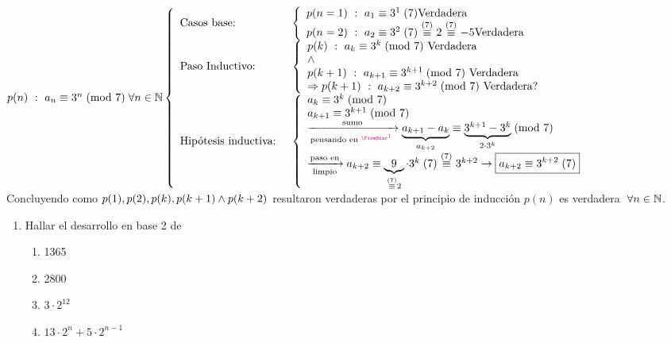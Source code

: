 $ p(n)\ :\ \congruencia{a_n}{3^n}{\text{mod } 7} \paratodo n \en \naturales\\
	\llave{ll}{
		\text{Casos base: } &
		\llave{l}{
			p(n = 1)\ :\ \congruencia{a_1}{3^1}{7} \text{Verdadera}\\
			p(n = 2)\ :\ \congruencia{a_2}{3^2}{7}\cong7 2 \cong7 -5 \text{Verdadera}\\
		} \\

		\text{Paso Inductivo: } &
		\llave{l}{
			p(k)\ : \  \congruencia{a_k}{3^k}{\text{mod } 7} \text{ Verdadera }\\
			\y\\
			p(k+1)\ : \  \congruencia{a_{k+1}}{3^{k+1}}{\text{mod } 7} \text{ Verdadera }\\
			\entonces p(k+1)\ : \  \congruencia{a_{k+2}}{3^{k+2}}{\text{mod } 7} \text{ Verdadera?}\\
		} \\

		\text{Hipótesis inductiva: } &
		\llave{l}{
			\congruencia{a_k}{3^k}{\text{mod } 7} \\
			\congruencia{a_{k+1}}{3^{k+1}}{\text{mod } 7} \\
			\flecha{sumo}[pensando en $\llamada{1}{}$]
			\congruencia{\ub{a_{k+1} - a_k}{a_{k+2}}}{\ub{3^{k+1} - 3^k}{2\cdot 3^k}}{\text{mod } 7}\\
			\flecha{paso en}[limpio]  \congruencia{a_{k+2}}{\ub{9}{\cong7 2} \cdot 3^k}{7} \cong7 3^{k+2}
			\to  \boxed{\congruencia{a_{k+2}}{3^{k+2}}{7} }
		}
	}
$\\
Concluyendo como $p(1), p(2), p(k), p(k+1) \y p(k+2)$ resultaron verdaderas por el principio de inducción
$p(n)$ es verdadera $\paratodo n \en \naturales$.

\ejercicio
\begin{enumerate}[label=\roman*)]
	\item Hallar el desarrollo en base 2 de
	      \begin{enumerate}[label=(\alph*)]
		      \item 1365
		      \item 2800
		      \item $3\cdot 2^{12}$
		      \item $13 \cdot 2^n + 5 \cdot 2^{n-1}$
	      \end{enumerate}
\end{enumerate}
\separadorCorto

\ejercicio
\separadorCorto
\ejercicio
\separadorCorto
\ejercicio
\separadorCorto

